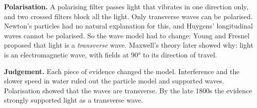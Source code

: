 \begin{practiceanswers}
\begin{practiceans}
\begin{modelanswer}
  \textbf{Polarisation.} A polarising filter passes light that vibrates in one direction only,
  and two crossed filters block all the light. Only transverse waves can be polarised. Newton's
  particles had no natural explanation for this, and Huygens' longitudinal waves cannot be
  polarised. So the wave model had to change: Young and Fresnel proposed that light is a
  \emph{transverse} wave. Maxwell's theory later showed why: light is an electromagnetic wave,
  with fields at \ang{90} to its direction of travel.

  \textbf{Judgement.} Each piece of evidence changed the model. Interference and the slower speed
  in water ruled out the particle model and supported waves. Polarisation showed that the waves
  are transverse. By the late 1800s the evidence strongly supported light as a transverse wave.
  \end{modelanswer}
  \begin{markingcriteria}
  \end{markingcriteria}
\end{practiceans}


\end{practiceanswers}
